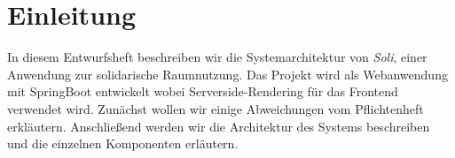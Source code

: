 
\chapter{Einleitung}
\label{ch:preface}


In diesem Entwurfsheft beschreiben wir die Systemarchitektur von \textit{Soli}, einer Anwendung zur solidarische Raumnutzung. 
Das Projekt wird als Webanwendung mit SpringBoot entwickelt wobei Serverside-Rendering für das Frontend verwendet wird.
Zunächst wollen wir einige Abweichungen vom Pflichtenheft erkläutern. 
Anschließend werden wir die Architektur des Systems beschreiben und die einzelnen Komponenten erläutern.